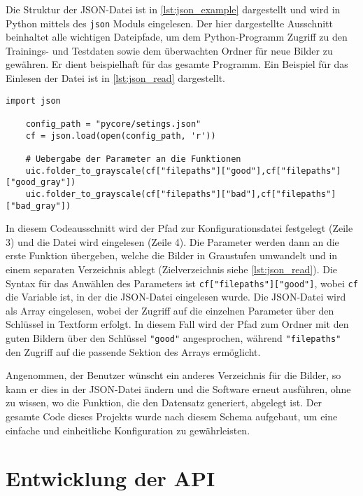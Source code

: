 Die Struktur der \ac{JSON}-Datei ist in \autoref{lst:json_example} dargestellt und wird in Python mittels des \texttt{json} Moduls eingelesen. Der hier dargestellte Ausschnitt beinhaltet alle wichtigen Dateipfade, um dem Python-Programm Zugriff zu den Trainings- und Testdaten sowie dem überwachten Ordner für neue Bilder zu gewähren. Er dient beispielhaft für das gesamte Programm. Ein Beispiel für das Einlesen der Datei ist in \autoref{lst:json_read} dargestellt.

\begin{lstlisting}[style=python, label=lst:json_read, caption={Einlesen der \ac{JSON}-Datei}]
    import json

    config_path = "pycore/setings.json"
    cf = json.load(open(config_path, 'r'))

    # Uebergabe der Parameter an die Funktionen
    uic.folder_to_grayscale(cf["filepaths"]["good"],cf["filepaths"]["good_gray"])
    uic.folder_to_grayscale(cf["filepaths"]["bad"],cf["filepaths"]["bad_gray"])

\end{lstlisting}

In diesem Codeausschnitt wird der Pfad zur Konfigurationsdatei festgelegt (Zeile 3) und die Datei wird eingelesen (Zeile 4). Die Parameter werden dann an die erste Funktion übergeben, welche die Bilder in Graustufen umwandelt und in einem separaten Verzeichnis ablegt (Zielverzeichnis siehe \autoref{lst:json_read}). Die Syntax für das Anwählen des Parameters ist \texttt{cf["filepaths"]["good"]}, wobei \texttt{cf} die Variable ist, in der die \ac{JSON}-Datei eingelesen wurde. Die \ac{JSON}-Datei wird als Array eingelesen, wobei der Zugriff auf die einzelnen Parameter über den Schlüssel in Textform erfolgt. In diesem Fall wird der Pfad zum Ordner mit den guten Bildern über den Schlüssel \texttt{"good"} angesprochen, während \texttt{"filepaths"} den Zugriff auf die passende Sektion des Arrays ermöglicht.

Angenommen, der Benutzer wünscht ein anderes Verzeichnis für die Bilder, so kann er dies in der \ac{JSON}-Datei ändern und die Software erneut ausführen, ohne zu wissen, wo die Funktion, die den Datensatz generiert, abgelegt ist. 
Der gesamte Code dieses Projekts wurde nach diesem Schema aufgebaut, um eine einfache und einheitliche Konfiguration zu gewährleisten.

\section{Entwicklung der API} \label{subsec:entwicklung_der_api}

